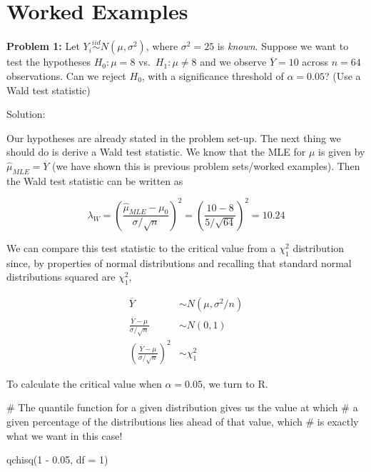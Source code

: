 \documentclass[
  letterpaper,
  DIV=11,
  numbers=noendperiod]{scrreprt}
\newenvironment{Shaded}{\begin{snugshade}}{\end{snugshade}}
\newcommand{\AttributeTok}[1]{\textcolor[rgb]{0.40,0.45,0.13}{#1}}
\newcommand{\CommentTok}[1]{\textcolor[rgb]{0.37,0.37,0.37}{#1}}
\newcommand{\DecValTok}[1]{\textcolor[rgb]{0.68,0.00,0.00}{#1}}
\newcommand{\FloatTok}[1]{\textcolor[rgb]{0.68,0.00,0.00}{#1}}
\newcommand{\FunctionTok}[1]{\textcolor[rgb]{0.28,0.35,0.67}{#1}}
\newcommand{\NormalTok}[1]{\textcolor[rgb]{0.00,0.23,0.31}{#1}}
\newcommand{\SpecialCharTok}[1]{\textcolor[rgb]{0.37,0.37,0.37}{#1}}
\begin{document}
\section{Worked Examples}\label{worked-examples-6}

\textbf{Problem 1:} Let \(Y_i \overset{iid}{\sim} N(\mu, \sigma^2)\),
where \(\sigma^2 = 25\) is \emph{known}. Suppose we want to test the
hypotheses \(H_0: \mu = 8\) vs.~\(H_1: \mu \neq 8\) and we observe
\(\overline{Y} = 10\) across \(n = 64\) observations. Can we reject
\(H_0\), with a significance threshold of \(\alpha = 0.05\)? (Use a Wald
test statistic)

Solution:

Our hypotheses are already stated in the problem set-up. The next thing
we should do is derive a Wald test statistic. We know that the MLE for
\(\mu\) is given by \(\hat{\mu}_{MLE} = \overline{Y}\) (we have shown
this is previous problem sets/worked examples). Then the Wald test
statistic can be written as

\[
\lambda_W = \left( \frac{\hat{\mu}_{MLE} - \mu_0}{\sigma/\sqrt{n}}\right)^2 = \left( \frac{10 - 8}{5/\sqrt{64}}\right)^2 = 10.24
\]

We can compare this test statistic to the critical value from a
\(\chi^2_1\) distribution since, by properties of normal distributions
and recalling that standard normal distributions squared are
\(\chi^2_1\),

\begin{align*}
    \overline{Y} & \sim N(\mu, \sigma^2/n) \\
    \frac{\overline{Y} - \mu}{\sigma/\sqrt{n}} & \sim N(0,1) \\
    \left( \frac{\overline{Y} - \mu}{\sigma/\sqrt{n}}  \right)^2 & \sim \chi^2_1 
\end{align*}

To calculate the critical value when \(\alpha = 0.05\), we turn to R.

\begin{Shaded}
\begin{Highlighting}[]
\CommentTok{\# The quantile function for a given distribution gives us the value at which}
\CommentTok{\# a given percentage of the distributions lies ahead of that value, which}
\CommentTok{\# is exactly what we want in this case!}

\FunctionTok{qchisq}\NormalTok{(}\DecValTok{1} \SpecialCharTok{{-}} \FloatTok{0.05}\NormalTok{, }\AttributeTok{df =} \DecValTok{1}\NormalTok{)}
\end{Highlighting}
\end{Shaded}
\end{document}
